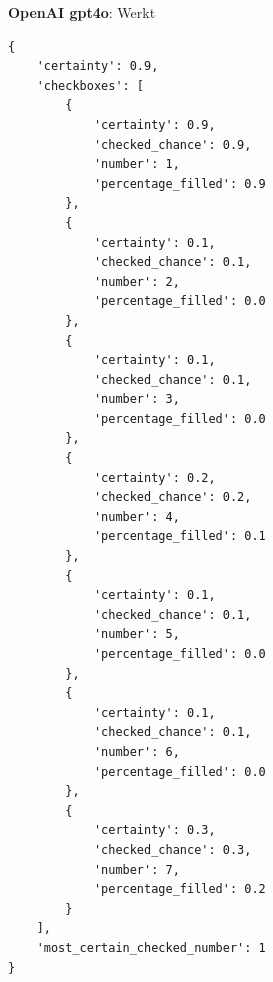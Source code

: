 \documentclass[12pt]{article}
\begin{document}
\begin{samepage}
    
\textbf{OpenAI gpt4o}: Werkt
\begin{listing}[H]
    
    \begin{verbatim}
{
    'certainty': 0.9, 
    'checkboxes': [
        {
            'certainty': 0.9, 
            'checked_chance': 0.9, 
            'number': 1, 
            'percentage_filled': 0.9
        }, 
        {
            'certainty': 0.1, 
            'checked_chance': 0.1, 
            'number': 2, 
            'percentage_filled': 0.0
        }, 
        {
            'certainty': 0.1, 
            'checked_chance': 0.1, 
            'number': 3, 
            'percentage_filled': 0.0
        }, 
        {
            'certainty': 0.2, 
            'checked_chance': 0.2, 
            'number': 4, 
            'percentage_filled': 0.1
        }, 
        {
            'certainty': 0.1, 
            'checked_chance': 0.1, 
            'number': 5, 
            'percentage_filled': 0.0
        }, 
        {
            'certainty': 0.1, 
            'checked_chance': 0.1, 
            'number': 6, 
            'percentage_filled': 0.0
        },
        {
            'certainty': 0.3, 
            'checked_chance': 0.3, 
            'number': 7, 
            'percentage_filled': 0.2
        }
    ], 
    'most_certain_checked_number': 1
}
\end{verbatim}
\end{listing}


\end{samepage}
\end{document}
